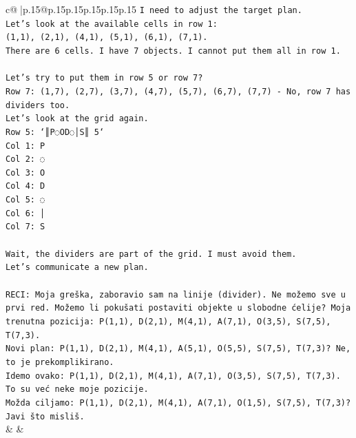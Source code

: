 \documentclass{article}
\begin{document}
{\begin{supertabular}{c@{$\;$}|p{.15\linewidth}@{}p{.15\linewidth}p{.15\linewidth}p{.15\linewidth}p{.15\linewidth}p{.15\linewidth}}
{{{\texttt{I need to adjust the target plan.} \\
\texttt{Let's look at the available cells in row 1:} \\
\texttt{(1,1), (2,1), (4,1), (5,1), (6,1), (7,1).} \\
\texttt{There are 6 cells. I have 7 objects. I cannot put them all in row 1.} \\
\\ 
\texttt{Let's try to put them in row 5 or row 7?} \\
\texttt{Row 7: (1,7), (2,7), (3,7), (4,7), (5,7), (6,7), (7,7) {-} No, row 7 has dividers too.} \\
\texttt{Let's look at the grid again.} \\
\texttt{Row 5: `║P◌OD◌│S║ 5`} \\
\texttt{Col 1: P} \\
\texttt{Col 2: ◌} \\
\texttt{Col 3: O} \\
\texttt{Col 4: D} \\
\texttt{Col 5: ◌} \\
\texttt{Col 6: │} \\
\texttt{Col 7: S} \\
\\ 
\texttt{Wait, the dividers are part of the grid. I must avoid them.} \\
\texttt{Let's communicate a new plan.} \\
\\ 
\texttt{RECI: Moja greška, zaboravio sam na linije (divider). Ne možemo sve u prvi red. Možemo li pokušati postaviti objekte u slobodne ćelije? Moja trenutna pozicija: P(1,1), D(2,1), M(4,1), A(7,1), O(3,5), S(7,5), T(7,3).} \\
\texttt{Novi plan: P(1,1), D(2,1), M(4,1), A(5,1), O(5,5), S(7,5), T(7,3)? Ne, to je prekomplikirano.} \\
\texttt{Idemo ovako: P(1,1), D(2,1), M(4,1), A(7,1), O(3,5), S(7,5), T(7,3). To su već neke moje pozicije.} \\
\texttt{Možda ciljamo: P(1,1), D(2,1), M(4,1), A(7,1), O(1,5), S(7,5), T(7,3)?} \\
\texttt{Javi što misliš.} \\
            }
        }
    }
    & & \\ \\


\end{supertabular}}
\end{document}
